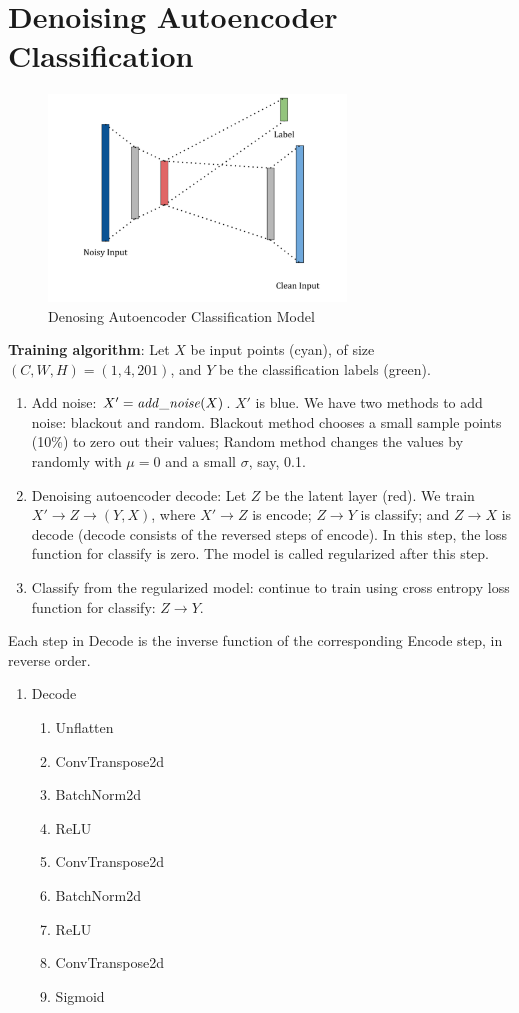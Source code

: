 \documentclass[twocolumn]{cinc}
\begin{document}
\section{Denoising Autoencoder Classification}

\begin{figure}[h]
\centering
\includegraphics[width=7.9cm]{dac.png}
\caption{Denosing Autoencoder Classification Model}
\label{FIGURA1}
\end{figure}

\textbf{Training algorithm}: Let $X$ be input points (cyan), of size $(C,W,H)=(1, 4,201)$, and $Y$ be the classification labels (green).
\begin{enumerate}
\item Add noise: $X'={\it add\_noise}(X)$. $X'$ is blue. We have two methods to add noise: blackout and random. Blackout method chooses a small sample points (10\%) to zero out their values; Random method changes the values by randomly with $\mu=0$ and a small $\sigma$, say, 0.1.
\item Denoising autoencoder decode: Let $Z$ be the latent layer (red). We train $X'\to Z\to (Y, X)$, where $X'\to Z$ is encode; $Z\to Y$ is classify; and $Z\to X$ is decode (decode consists of the reversed steps of encode). In this step, the loss function for classify is zero. The model is called regularized after this step.
\item Classify from the regularized model: continue to train using cross entropy loss function for classify: $Z\to Y$.

\end{enumerate}

Each step in Decode is the inverse function of the 
corresponding Encode step, in reverse order.

\begin{enumerate}\addtocounter{enumi}{2}
\item Decode
\begin{enumerate}
\item Unflatten
\item ConvTranspose2d
\item BatchNorm2d
\item ReLU
\item ConvTranspose2d
\item BatchNorm2d
\item ReLU
\item ConvTranspose2d
\item Sigmoid
\end{enumerate}
\end{enumerate}
\end{document}
